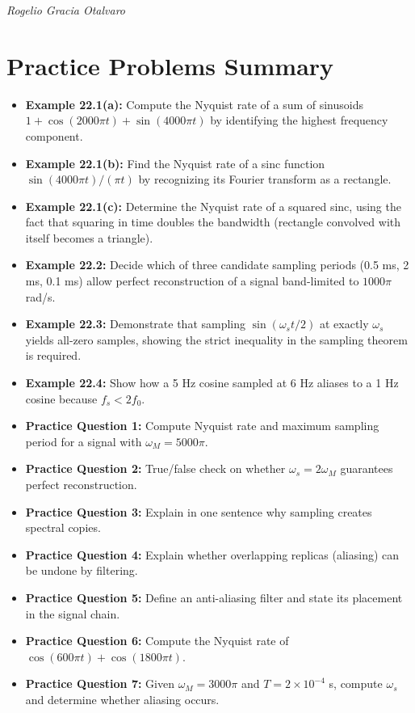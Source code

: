 \documentclass[11pt]{article}
\begin{document}
\textit{Rogelio Gracia Otalvaro}

\section*{Practice Problems Summary}

\begin{itemize}
  \item \textbf{Example 22.1(a):} Compute the Nyquist rate of a sum of sinusoids $1 + \cos(2000\pi t) + \sin(4000\pi t)$ by identifying the highest frequency component.
  \item \textbf{Example 22.1(b):} Find the Nyquist rate of a sinc function $\sin(4000\pi t)/(\pi t)$ by recognizing its Fourier transform as a rectangle.
  \item \textbf{Example 22.1(c):} Determine the Nyquist rate of a squared sinc, using the fact that squaring in time doubles the bandwidth (rectangle convolved with itself becomes a triangle).
  \item \textbf{Example 22.2:} Decide which of three candidate sampling periods (0.5 ms, 2 ms, 0.1 ms) allow perfect reconstruction of a signal band-limited to $1000\pi$ rad/s.
  \item \textbf{Example 22.3:} Demonstrate that sampling $\sin(\omega_s t/2)$ at exactly $\omega_s$ yields all-zero samples, showing the strict inequality in the sampling theorem is required.
  \item \textbf{Example 22.4:} Show how a 5 Hz cosine sampled at 6 Hz aliases to a 1 Hz cosine because $f_s < 2f_0$.
  \item \textbf{Practice Question 1:} Compute Nyquist rate and maximum sampling period for a signal with $\omega_M = 5000\pi$.
  \item \textbf{Practice Question 2:} True/false check on whether $\omega_s = 2\omega_M$ guarantees perfect reconstruction.
  \item \textbf{Practice Question 3:} Explain in one sentence why sampling creates spectral copies.
  \item \textbf{Practice Question 4:} Explain whether overlapping replicas (aliasing) can be undone by filtering.
  \item \textbf{Practice Question 5:} Define an anti-aliasing filter and state its placement in the signal chain.
  \item \textbf{Practice Question 6:} Compute the Nyquist rate of $\cos(600\pi t) + \cos(1800\pi t)$.
  \item \textbf{Practice Question 7:} Given $\omega_M = 3000\pi$ and $T = 2 \times 10^{-4}$ s, compute $\omega_s$ and determine whether aliasing occurs.

\end{itemize}
\end{document}
